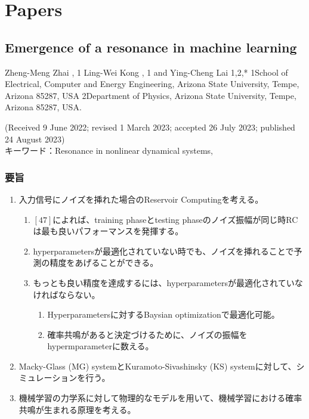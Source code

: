 \section{Papers}
\subsection{Emergence of a resonance in machine learning}
\label{Emergence of a resonance in machine learning}

Zheng-Meng Zhai , 1 Ling-Wei Kong , 1 and Ying-Cheng Lai 1,2,*
1School of Electrical, Computer and Energy Engineering, Arizona State University, Tempe, Arizona 85287, USA
2Department of Physics, Arizona State University, Tempe, Arizona 85287, USA.

\noindent (Received 9 June 2022; revised 1 March 2023; accepted 26 July 2023; published 24 August 2023)
\\

\noindent キーワード：Resonance in nonlinear dynamical systems, 

\subsubsection{要旨}

\begin{enumerate}
  \item 入力信号にノイズを挿れた場合のReservoir Computingを考える。\begin{enumerate}
    \item $[47]$によれば、training phaseとtesting phaseのノイズ振幅が同じ時RCは最も良いパフォーマンスを発揮する。
    \item hyperparametersが最適化されていない時でも、ノイズを挿れることで予測の精度をあげることができる。
    \item もっとも良い精度を達成するには、hyperparametersが最適化されていなければならない。\begin{enumerate}
      \item Hyperparametersに対するBaysian optimizationで最適化可能。
      \item 確率共鳴があると決定づけるために、ノイズの振幅をhypermparameterに数える。
    \end{enumerate}
  \end{enumerate} 
  \item Macky-Glass (MG) systemとKuramoto-Sivashinsky (KS) systemに対して、シミュレーションを行う。
  \item 機械学習の力学系に対して物理的なモデルを用いて、機械学習における確率共鳴が生まれる原理を考える。
\end{enumerate}


